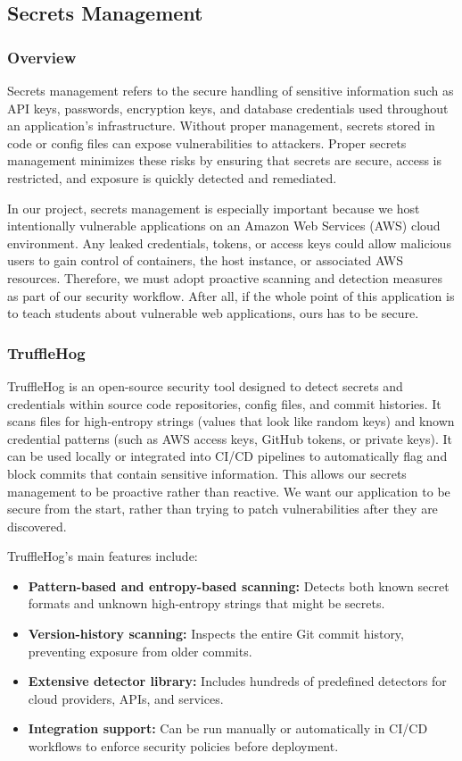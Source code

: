 \documentclass[12pt,titlepage]{article}
\begin{document}
\subsection{Secrets Management}

\subsubsection{Overview}
Secrets management refers to the secure handling of sensitive information such as API keys, passwords, encryption keys, and database credentials used throughout an application's infrastructure. Without proper management, secrets stored in code or config files can expose vulnerabilities to attackers. Proper secrets management minimizes these risks by ensuring that secrets are secure, access is restricted, and exposure is quickly detected and remediated. 

In our project, secrets management is especially important because we host intentionally vulnerable applications on an Amazon Web Services (AWS) cloud environment. Any leaked credentials, tokens, or access keys could allow malicious users to gain control of containers, the host instance, or associated AWS resources. Therefore, we must adopt proactive scanning and detection measures as part of our security workflow. After all, if the whole point of this application is to teach students about vulnerable web applications, ours has to be secure.

\subsubsection{TruffleHog}
TruffleHog is an open-source security tool designed to detect secrets and credentials within source code repositories, config files, and commit histories. It scans files for high-entropy strings (values that look like random keys) and known credential patterns (such as AWS access keys, GitHub tokens, or private keys). It can be used locally or integrated into CI/CD pipelines to automatically flag and block commits that contain sensitive information. This allows our secrets management to be proactive rather than reactive. We want our application to be secure from the start, rather than trying to patch vulnerabilities after they are discovered. 

TruffleHog’s main features include:
\begin{itemize}
    \item \textbf{Pattern-based and entropy-based scanning:} Detects both known secret formats and unknown high-entropy strings that might be secrets. 
    \item \textbf{Version-history scanning:} Inspects the entire Git commit history, preventing exposure from older commits.
    \item \textbf{Extensive detector library:} Includes hundreds of predefined detectors for cloud providers, APIs, and services.
    \item \textbf{Integration support:} Can be run manually or automatically in CI/CD workflows to enforce security policies before deployment.
\end{itemize}
\end{document}
